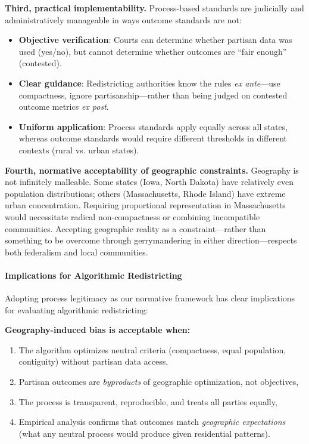 \textbf{Third, practical implementability.} Process-based standards are judicially and administratively manageable in ways outcome standards are not:
\begin{itemize}
\item \textbf{Objective verification}: Courts can determine whether partisan data was used (yes/no), but cannot determine whether outcomes are ``fair enough'' (contested).
\item \textbf{Clear guidance}: Redistricting authorities know the rules \textit{ex ante}---use compactness, ignore partisanship---rather than being judged on contested outcome metrics \textit{ex post}.
\item \textbf{Uniform application}: Process standards apply equally across all states, whereas outcome standards would require different thresholds in different contexts (rural vs. urban states).
\end{itemize}

\textbf{Fourth, normative acceptability of geographic constraints.} Geography is not infinitely malleable. Some states (Iowa, North Dakota) have relatively even population distributions; others (Massachusetts, Rhode Island) have extreme urban concentration. Requiring proportional representation in Massachusetts would necessitate radical non-compactness or combining incompatible communities. Accepting geographic reality as a constraint---rather than something to be overcome through gerrymandering in either direction---respects both federalism and local communities.

\paragraph{Implications for Algorithmic Redistricting}

Adopting process legitimacy as our normative framework has clear implications for evaluating algorithmic redistricting:

\textbf{Geography-induced bias is acceptable when:}
\begin{enumerate}
\item The algorithm optimizes neutral criteria (compactness, equal population, contiguity) without partisan data access,
\item Partisan outcomes are \textit{byproducts} of geographic optimization, not objectives,
\item The process is transparent, reproducible, and treats all parties equally,
\item Empirical analysis confirms that outcomes match \textit{geographic expectations} (what any neutral process would produce given residential patterns).
\end{enumerate}

